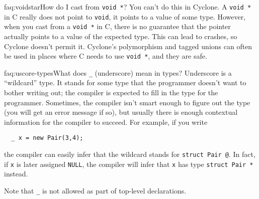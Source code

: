 \begin{faqa}{faq:voidstar}{How do I cast from \texttt{void *}?}
You can't do this in Cyclone.  A \texttt{void *} in C really does not
point to \texttt{void}, it points to a value of some type.  However,
when you cast from a \texttt{void *} in C, there is no guarantee that
the pointer actually points to a value of the expected type.  This can
lead to crashes, so Cyclone doesn't permit it.  Cyclone's
polymorphism and tagged unions can often be used in places where C
needs to use \texttt{void *}, and they are safe.
\end{faqa}

\begin{faqa}{faq:uscore-types}{What does \texttt{_} (underscore) mean in types?}
Underscore is a ``wildcard'' type.  It stands for some type that the
programmer doesn't want to bother writing out; the compiler is
expected to fill in the type for the programmer.  Sometimes, the
compiler isn't smart enough to figure out the type (you will get an
error message if so), but usually there is enough contextual
information for the compiler to succeed.  For example, if you write
\begin{verbatim}
  _ x = new Pair(3,4);
\end{verbatim}
the compiler can easily infer that the wildcard stands for
\texttt{struct Pair @}.  In fact, if \texttt{x} is later assigned
\texttt{NULL}, the compiler will infer that \texttt{x} has type
\texttt{struct Pair *} instead.

Note that \texttt{_} is not allowed as part of top-level declarations.
\end{faqa}


